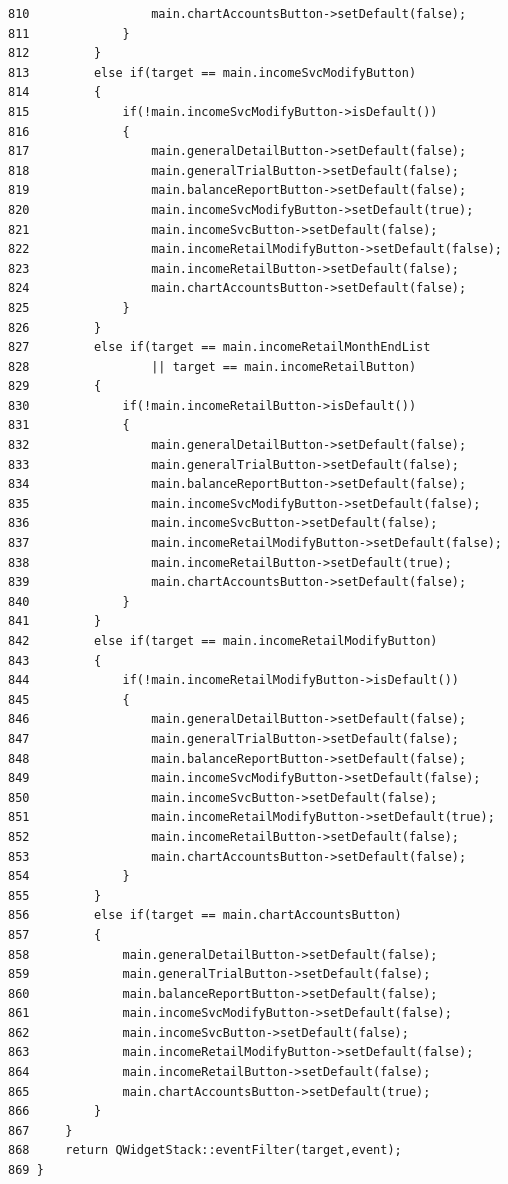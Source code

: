 \begin{verbatim}
810                 main.chartAccountsButton->setDefault(false);
811             }
812         }
813         else if(target == main.incomeSvcModifyButton)
814         {
815             if(!main.incomeSvcModifyButton->isDefault())
816             {
817                 main.generalDetailButton->setDefault(false);
818                 main.generalTrialButton->setDefault(false);
819                 main.balanceReportButton->setDefault(false);
820                 main.incomeSvcModifyButton->setDefault(true);
821                 main.incomeSvcButton->setDefault(false);
822                 main.incomeRetailModifyButton->setDefault(false);
823                 main.incomeRetailButton->setDefault(false);
824                 main.chartAccountsButton->setDefault(false);
825             }
826         }
827         else if(target == main.incomeRetailMonthEndList
828                 || target == main.incomeRetailButton)
829         {
830             if(!main.incomeRetailButton->isDefault())
831             {
832                 main.generalDetailButton->setDefault(false);
833                 main.generalTrialButton->setDefault(false);
834                 main.balanceReportButton->setDefault(false);
835                 main.incomeSvcModifyButton->setDefault(false);
836                 main.incomeSvcButton->setDefault(false);
837                 main.incomeRetailModifyButton->setDefault(false);
838                 main.incomeRetailButton->setDefault(true);
839                 main.chartAccountsButton->setDefault(false);
840             }
841         }
842         else if(target == main.incomeRetailModifyButton)
843         {
844             if(!main.incomeRetailModifyButton->isDefault())
845             {
846                 main.generalDetailButton->setDefault(false);
847                 main.generalTrialButton->setDefault(false);
848                 main.balanceReportButton->setDefault(false);
849                 main.incomeSvcModifyButton->setDefault(false);
850                 main.incomeSvcButton->setDefault(false);
851                 main.incomeRetailModifyButton->setDefault(true);
852                 main.incomeRetailButton->setDefault(false);
853                 main.chartAccountsButton->setDefault(false);
854             }
855         }
856         else if(target == main.chartAccountsButton)
857         {
858             main.generalDetailButton->setDefault(false);
859             main.generalTrialButton->setDefault(false);
860             main.balanceReportButton->setDefault(false);
861             main.incomeSvcModifyButton->setDefault(false);
862             main.incomeSvcButton->setDefault(false);
863             main.incomeRetailModifyButton->setDefault(false);
864             main.incomeRetailButton->setDefault(false);
865             main.chartAccountsButton->setDefault(true);
866         }
867     }
868     return QWidgetStack::eventFilter(target,event);
869 }  
\end{verbatim}\normalsize 


